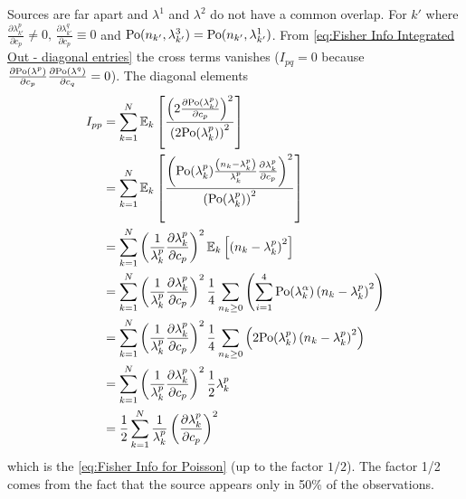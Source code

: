 Sources are far apart and $\lambda^1$ and $\lambda^2$ do not have a common overlap. For $k'$ where $\frac{\partial\lambda_{k'}^p}{\partial c_p}\neq0,\,\frac{\partial\lambda_{k'}^q}{\partial c_p}\equiv0$ and $\mathrm{Po}(n_{k'},\lambda_{k'}^3)=\mathrm{Po}(n_{k'},\lambda_{k'}^1)$.
From \autoref{eq:Fisher Info Integrated Out - diagonal entries} the cross terms vanishes ($I_{pq}=0$ because $\frac{\partial\mathrm{Po}(\lambda^p)}{\partial c_p}\frac{\partial\mathrm{Po}(\lambda^q)}{\partial c_{q}}=0$). The diagonal elements 
%
\begin{alignat*}{1}
	I_{pp} & =\sum_{k=1}^N\mathbb{E}_k\left[\frac{\left(2\frac{\partial\mathrm{Po}(\lambda_k^p)}{\partial c_p}\right)^2}{\left(2\mathrm{Po}(\lambda_k^p)\right)^2}\right]\\
 	& =\sum_{k=1}^N\mathbb{E}_k\left[\frac{\left(\mathrm{Po}(\lambda_k^p)\frac{\left(n_k-\lambda_k^p\right)}{\lambda_k^p}\frac{\partial\lambda_k^p}{\partial c_p}\right)^2}{\left(\mathrm{Po}(\lambda_k^p)\right)^2}\right]\\
 	& =\sum_{k=1}^N\left(\frac{1}{\lambda_k^p}\frac{\partial\lambda_k^p}{\partial c_p}\right)^2\mathbb{E}_k\left[\left(n_k-\lambda_k^p\right)^2\right]\\
 	& =\sum_{k=1}^N\left(\frac{1}{\lambda_k^p}\frac{\partial\lambda_k^p}{\partial c_p}\right)^2\frac{1}{4}\sum_{n_k\geq0}\left(\sum_{i=1}^4\mathrm{Po}(\lambda_k^\alpha)\left(n_k-\lambda_k^p\right)^2\right)\\
 	& =\sum_{k=1}^N\left(\frac{1}{\lambda_k^p}\frac{\partial\lambda_k^p}{\partial c_p}\right)^2\frac{1}{4}\sum_{n_k\geq0}\left(2\mathrm{Po}(\lambda_k^p)\left(n_k-\lambda_k^p\right)^2\right)\\
 	& =\sum_{k=1}^N\left(\frac{1}{\lambda_k^p}\frac{\partial\lambda_k^p}{\partial c_p}\right)^2\frac{1}{2}\lambda_k^p\\
 	& =\frac{1}{2}\sum_{k=1}^N\frac{1}{\lambda_k^p}\left(\frac{\partial\lambda_k^p}{\partial c_p}\right)^2
\end{alignat*}
%
which is the \autoref{eq:Fisher Info for Poisson} (up to the factor $1/2$). The factor 1/2 comes from the fact that the source appears only in 50\% of the observations.


